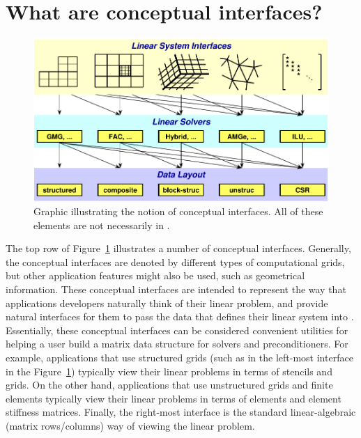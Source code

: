 
\section{What are conceptual interfaces?}
\label{sec-What-are-conceptual-interfaces}

\begin{figure}
\centering
\includegraphics[width=5in]{fig_concep_iface}
\caption{%
Graphic illustrating the notion of conceptual interfaces.
All of these elements are not necessarily in \hypre{}.}
\label{fig-conceptual-interface}
\end{figure}

The top row of Figure~\ref{fig-conceptual-interface} illustrates a number of
conceptual interfaces.  Generally, the conceptual interfaces are denoted by
different types of computational grids, but other application features might
also be used, such as geometrical information.  These conceptual interfaces are
intended to represent the way that applications developers naturally think of
their linear problem, and provide natural interfaces for them to pass the data
that defines their linear system into \hypre{}.  Essentially, these conceptual
interfaces can be considered convenient utilities for helping a user build a
matrix data structure for \hypre{} solvers and preconditioners.  For example,
applications that use structured grids (such as in the left-most interface in
the Figure~\ref{fig-conceptual-interface}) typically view their linear problems
in terms of stencils and grids.  On the other hand, applications that use
unstructured grids and finite elements typically view their linear problems in
terms of elements and element stiffness matrices.  Finally, the right-most
interface is the standard linear-algebraic (matrix rows/columns) way of viewing
the linear problem.

